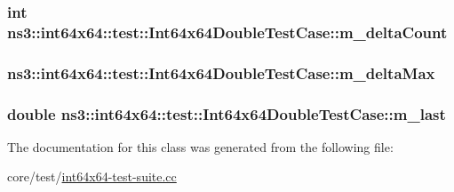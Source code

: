 \subsubsection[{\texorpdfstring{m\+\_\+delta\+Count}{m_deltaCount}}]{\setlength{\rightskip}{0pt plus 5cm}int ns3\+::int64x64\+::test\+::\+Int64x64\+Double\+Test\+Case\+::m\+\_\+delta\+Count\hspace{0.3cm}{\ttfamily [private]}}\hypertarget{classns3_1_1int64x64_1_1test_1_1Int64x64DoubleTestCase_a7d56d2679c037d6a28351eb3b8b20d3e}{}\label{classns3_1_1int64x64_1_1test_1_1Int64x64DoubleTestCase_a7d56d2679c037d6a28351eb3b8b20d3e}
\subsubsection[{\texorpdfstring{m\+\_\+delta\+Max}{m_deltaMax}}]{ ns3\+::int64x64\+::test\+::\+Int64x64\+Double\+Test\+Case\+::m\+\_\+delta\+Max\hspace{0.3cm}{\ttfamily [private]}}\hypertarget{classns3_1_1int64x64_1_1test_1_1Int64x64DoubleTestCase_ab52535c9a92fd852a031900b3ba8b57d}{}\label{classns3_1_1int64x64_1_1test_1_1Int64x64DoubleTestCase_ab52535c9a92fd852a031900b3ba8b57d}
\subsubsection[{\texorpdfstring{m\+\_\+last}{m_last}}]{ double ns3\+::int64x64\+::test\+::\+Int64x64\+Double\+Test\+Case\+::m\+\_\+last\hspace{0.3cm}{\ttfamily [private]}}\hypertarget{classns3_1_1int64x64_1_1test_1_1Int64x64DoubleTestCase_a8ac90dc336e01dc3de2475f47ec10060}{}\label{classns3_1_1int64x64_1_1test_1_1Int64x64DoubleTestCase_a8ac90dc336e01dc3de2475f47ec10060}


The documentation for this class was generated from the following file\+:\begin{DoxyCompactItemize}
\item 
core/test/\hyperlink{int64x64-test-suite_8cc}{int64x64-\/test-\/suite.\+cc}\end{DoxyCompactItemize}
